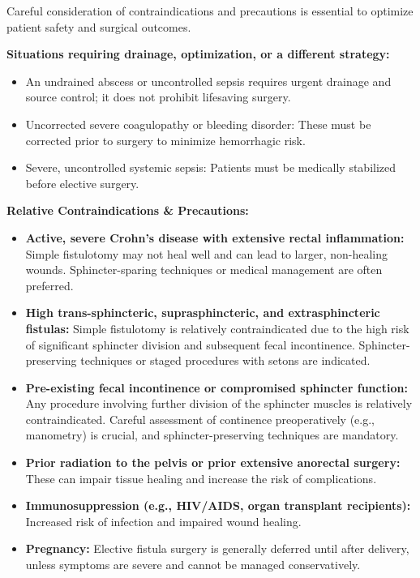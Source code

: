 Careful consideration of contraindications and precautions is essential to optimize patient safety and surgical outcomes.

\textbf{Situations requiring drainage, optimization, or a different strategy:}
\begin{itemize}
  \item An undrained abscess or uncontrolled sepsis requires urgent drainage and source control; it does not prohibit lifesaving surgery.
  \item Uncorrected severe coagulopathy or bleeding disorder: These must be corrected prior to surgery to minimize hemorrhagic risk.
  \item Severe, uncontrolled systemic sepsis: Patients must be medically stabilized before elective surgery.
\end{itemize}

\textbf{Relative Contraindications \& Precautions:}
\begin{itemize}
  \item \textbf{Active, severe Crohn's disease with extensive rectal inflammation:} Simple fistulotomy may not heal well and can lead to larger, non-healing wounds. Sphincter-sparing techniques or medical management are often preferred.
  \item \textbf{High trans-sphincteric, suprasphincteric, and extrasphincteric fistulas:} Simple fistulotomy is relatively contraindicated due to the high risk of significant sphincter division and subsequent fecal incontinence. Sphincter-preserving techniques or staged procedures with setons are indicated.
  \item \textbf{Pre-existing fecal incontinence or compromised sphincter function:} Any procedure involving further division of the sphincter muscles is relatively contraindicated. Careful assessment of continence preoperatively (e.g., manometry) is crucial, and sphincter-preserving techniques are mandatory.
  \item \textbf{Prior radiation to the pelvis or prior extensive anorectal surgery:} These can impair tissue healing and increase the risk of complications.
  \item \textbf{Immunosuppression (e.g., HIV/AIDS, organ transplant recipients):} Increased risk of infection and impaired wound healing.
  \item \textbf{Pregnancy:} Elective fistula surgery is generally deferred until after delivery, unless symptoms are severe and cannot be managed conservatively.
\end{itemize}

